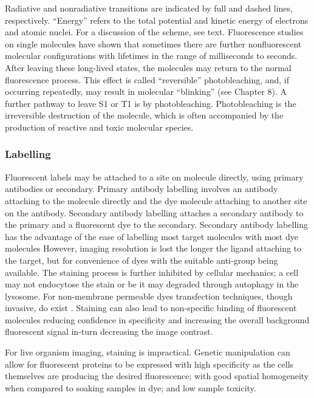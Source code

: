 Radiative and nonradiative transitions are indicated by full and dashed lines, respectively. “Energy” refers to
the total potential and kinetic energy of electrons and atomic nuclei. For a discussion of the
scheme, see text. Fluorescence studies on single molecules have shown that sometimes there
are further nonfluorescent molecular configurations with lifetimes in the range of milliseconds
to seconds. After leaving these long-lived states, the molecules may return to the normal
fluorescence process. This effect is called “reversible” photobleaching, and, if occurring
repeatedly, may result in molecular “blinking” (see Chapter 8). A further pathway to leave S1 or
T1 is by photobleaching. Photobleaching is the irreversible destruction of the molecule, which
is often accompanied by the production of reactive and toxic molecular species.

\subsubsection{Labelling}

Fluorescent labels may be attached to a site on molecule directly, using primary antibodies or secondary.
Primary antibody labelling involves an antibody attaching to the molecule directly and the dye molecule attaching to another site on the antibody.
Secondary antibody labelling attaches a secondary antibody to the primary and a fluorescent dye to the secondary.
Secondary antibody labelling has the advantage of the ease of labelling most target molecules with most dye molecules
However, imaging resolution is lost the longer the ligand attaching to the target, but for convenience of dyes with the suitable anti-group being available.
The staining process is further inhibited by cellular mechanics; a cell may not endocytose the stain or be it may degraded through autophagy in the lysosome.
For non-membrane permeable dyes transfection techniques, though invasive, do exist \cite{}.
Staining can also lead to non-specific binding of fluorescent molecules reducing confidence in specificity and increasing the overall background fluorescent signal in-turn decreasing the image contrast.

For live organism imaging, staining is impractical.
Genetic manipulation can allow for fluorescent proteins to be expressed with high specificity as the cells themselves are producing the desired fluorescence; with good spatial homogeneity when compared to soaking samples in dye; and low sample toxicity.

